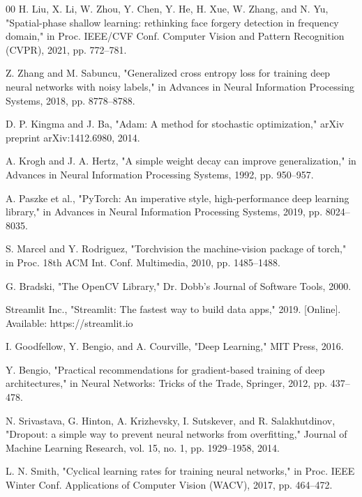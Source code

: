 \documentclass[conference]{IEEEtran}
\begin{document}
\begin{thebibliography}{00}
 H. Liu, X. Li, W. Zhou, Y. Chen, Y. He, H. Xue, W. Zhang, and N. Yu, "Spatial-phase shallow learning: rethinking face forgery detection in frequency domain," in Proc. IEEE/CVF Conf. Computer Vision and Pattern Recognition (CVPR), 2021, pp. 772–781.

 Z. Zhang and M. Sabuncu, "Generalized cross entropy loss for training deep neural networks with noisy labels," in Advances in Neural Information Processing Systems, 2018, pp. 8778–8788.

 D. P. Kingma and J. Ba, "Adam: A method for stochastic optimization," arXiv preprint arXiv:1412.6980, 2014.

 A. Krogh and J. A. Hertz, "A simple weight decay can improve generalization," in Advances in Neural Information Processing Systems, 1992, pp. 950–957.

 A. Paszke et al., "PyTorch: An imperative style, high-performance deep learning library," in Advances in Neural Information Processing Systems, 2019, pp. 8024–8035.

 S. Marcel and Y. Rodriguez, "Torchvision the machine-vision package of torch," in Proc. 18th ACM Int. Conf. Multimedia, 2010, pp. 1485–1488.

 G. Bradski, "The OpenCV Library," Dr. Dobb's Journal of Software Tools, 2000.

 Streamlit Inc., "Streamlit: The fastest way to build data apps," 2019. [Online]. Available: https://streamlit.io

 I. Goodfellow, Y. Bengio, and A. Courville, "Deep Learning," MIT Press, 2016.

 Y. Bengio, "Practical recommendations for gradient-based training of deep architectures," in Neural Networks: Tricks of the Trade, Springer, 2012, pp. 437–478.

 N. Srivastava, G. Hinton, A. Krizhevsky, I. Sutskever, and R. Salakhutdinov, "Dropout: a simple way to prevent neural networks from overfitting," Journal of Machine Learning Research, vol. 15, no. 1, pp. 1929–1958, 2014.

 L. N. Smith, "Cyclical learning rates for training neural networks," in Proc. IEEE Winter Conf. Applications of Computer Vision (WACV), 2017, pp. 464–472.


\end{thebibliography}
\end{document}
